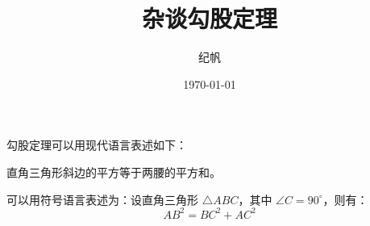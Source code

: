 \documentclass{ctexart}
\title{\heiti 杂谈勾股定理}   %
\author{\kaishu 纪帆}    %
\date{\today}   %
\newcommand\degree{^\circ}
\begin{document}
    \maketitle
    勾股定理可以用现代语言表述如下：

    直角三角形斜边的平方等于两腰的平方和。

    可以用符号语言表述为：设直角三角形 $\triangle ABC$，其中 $\angle C=90\degree$，则有：
    \begin{equation}    %
        AB^2=BC^2+AC^2
    \end{equation}
\end{document}
